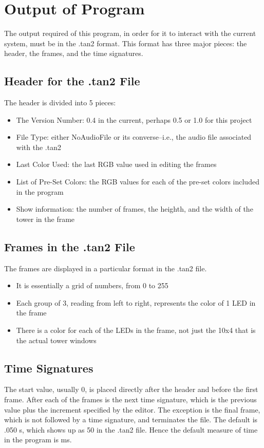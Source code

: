 \documentclass[12pt]{extarticle}
\begin{document}
\clearpage

\section{Output of Program}
The output required of this program, in order for it to interact with the current system, must be in the .tan2 format.  This format has three major pieces: the header, the frames, and the time signatures.
\newline
\subsection{Header for the .tan2 File}
The header is divided into 5 pieces:
	\begin{itemize}
		\item The Version Number: 0.4 in the current, perhaps 0.5 or 1.0 for this project
		\item File Type: either NoAudioFile or its converse--i.e., the audio file associated with the .tan2
		\item Last Color Used: the last RGB value used in editing the frames
		\item List of Pre-Set Colors: the RGB values for each of the pre-set colors included in the program
		\item Show information: the number of frames, the heighth, and the width of the tower in the frame
	\end{itemize}
\subsection{Frames in the .tan2 File}
The frames are displayed in a particular format in the .tan2 file.
	\begin{itemize}
		\item It is essentially a grid of numbers, from 0 to 255
		\item Each group of 3, reading from left to right, represents the color of 1 LED in the frame
		\item There is a color for each of the LEDs in the frame, not just the 10x4 that is the actual tower windows
	\end{itemize}

\subsection{Time Signatures}
The start value, usually 0, is placed directly after the header and before the first frame.  After each of the frames is the next time signature, which is the previous value plus the increment specified by the editor.  The exception is the final frame, which is not followed by a time signature, and terminates the file.  The default is .050 s, which shows up as 50 in the .tan2 file.  Hence the default measure of time in the program is ms.
\end{document}
